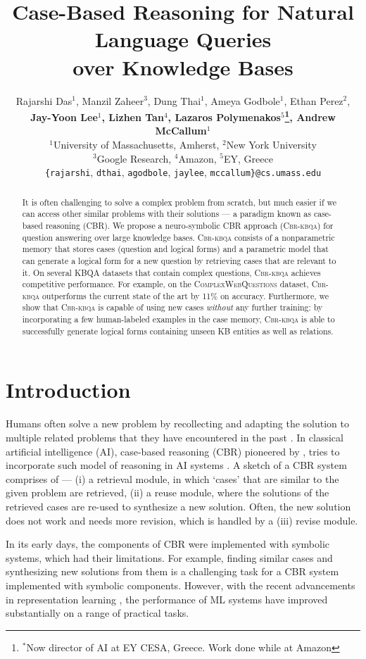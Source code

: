 \documentclass[11pt]{article}
\title{Case-Based Reasoning for Natural Language Queries \\over Knowledge Bases}
\author{Rajarshi Das$^{1}$, Manzil Zaheer$^{3}$, Dung Thai$^{1}$, Ameya Godbole$^{1}$, Ethan Perez$^{2}$, \\\textbf{Jay-Yoon Lee$^{1}$, Lizhen Tan$^{4}$, Lazaros Polymenakos$^{5}$\thanks{$^*$Now director of AI at EY CESA, Greece. Work done while at Amazon}, Andrew McCallum$^{1}$}\\
$^{1}$University of Massachusetts, Amherst, $^{2}$New York University\\
$^{3}$Google Research, $^{4}$Amazon, $^{5}$EY, Greece\\
\texttt{\{rajarshi}, \texttt{dthai}, \texttt{agodbole}, \texttt{jaylee}, \texttt{mccallum\}}\texttt{@cs.umass.edu}
}
\newcommand{\cwq}{\textsc{ComplexWebQuestions}\xspace}
\newcommand{\alg}{\textsc{Cbr-kbqa}\xspace}
\begin{document}
\maketitle
\begin{abstract}

It is often challenging to solve a complex problem from scratch, but much easier if we can access other similar problems with their solutions --- a paradigm known as case-based reasoning (CBR).
We propose a neuro-symbolic CBR approach (\alg) for question answering over large knowledge bases. \alg consists of a nonparametric memory that stores cases (question and logical forms) and a parametric model that can generate a logical form for a new question by retrieving cases that are relevant to it. On several KBQA datasets that contain complex questions, \alg achieves competitive performance. For example, on the \cwq dataset, \alg outperforms the current state of the art by 11\% on accuracy. Furthermore, we show that \alg is capable of using new cases \emph{without} any further training: by incorporating a few human-labeled examples in the case memory, \alg is able to successfully generate logical forms containing unseen KB entities as well as relations.

\end{abstract}

\section{Introduction}
\label{sec:intro}
Humans often solve a new problem by recollecting and adapting the solution to multiple related problems that they have encountered in the past \cite{ross1984remindings,lancaster1987problem,schmidt1990cognitive}. In classical artificial intelligence (AI), case-based reasoning (CBR) pioneered by \citet{schank1982dynamic}, tries to incorporate such model of reasoning in AI systems \cite{kolodner1983maintaining,rissland1983examples,leake1996cbr}. A sketch of a CBR system \cite{aamodt1994case} comprises of --- (i) a retrieval module, in which `cases' that are similar to the given problem are retrieved, (ii) a reuse module, where the solutions of the retrieved cases are re-used to synthesize a new solution. Often, the new solution does not work and needs more revision, which is handled by a (iii) revise module.

In its early days, the components of CBR were implemented with symbolic systems, which had their limitations. For example, finding similar cases and synthesizing new solutions from them is a challenging task for a CBR system implemented with symbolic components. However, with the recent advancements in representation learning \cite{lecun2015deep}, the performance of ML systems have improved substantially on a range of practical tasks.  
\end{document}
